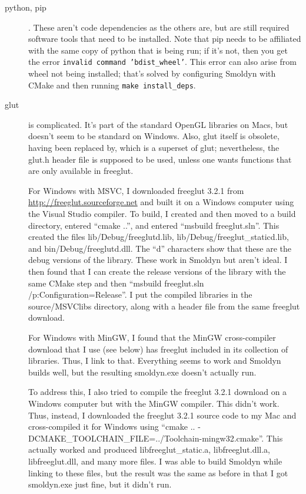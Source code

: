 \documentclass {scrbook}
\newcommand {\ttt} {\texttt}
\begin{document}
\begin{description}

\item[python, pip]. These aren't code dependencies as the others are, but are still required software tools that need to be installed. Note that pip needs to be affiliated with the same copy of python that is being run; if it's not, then you get the error \ttt{invalid command 'bdist\_wheel'}. This error can also arise from wheel not being installed; that's solved by configuring Smoldyn with CMake and then running \ttt{make install\_deps}.

\item[glut] is complicated. It's part of the standard OpenGL libraries on Macs, but doesn't seem to be standard on Windows. Also, glut itself is obsolete, having been replaced by, which is a superset of glut; nevertheless, the glut.h header file is supposed to be used, unless one wants functions that are only available in freeglut.

For Windows with MSVC, I downloaded freeglut 3.2.1 from \url{http://freeglut.sourceforge.net} and built it on a Windows computer using the Visual Studio compiler. To build, I created and then moved to a build directory, entered ``cmake ..'', and entered ``msbuild freeglut.sln''. This created the files lib/Debug/freeglutd.lib, lib/Debug/freeglut\_staticd.lib, and bin/Debug/freeglutd.dll. The ``d'' characters show that these are the debug versions of the library. These work in Smoldyn but aren't ideal. I then found that I can create the release versions of the library with the same CMake step and then ``msbuild freeglut.sln /p:Configuration=Release''. I put the compiled libraries in the source/MSVClibs directory, along with a header file from the same freeglut download.

For Windows with MinGW, I found that the MinGW cross-compiler download that I use (see below) has freeglut included in its collection of libraries. Thus, I link to that. Everything seems to work and Smoldyn builds well, but the resulting smoldyn.exe doesn't actually run.

To address this, I also tried to compile the freeglut 3.2.1 download on a Windows computer but with the MinGW compiler. This didn't work. Thus, instead, I downloaded the freeglut 3.2.1 source code to my Mac and cross-compiled it for Windows using ``cmake .. -DCMAKE\_TOOLCHAIN\_FILE=../Toolchain-mingw32.cmake''. This actually worked and produced libfreeglut\_static.a, libfreeglut.dll.a, libfreeglut.dll, and many more files. I was able to build Smoldyn while linking to these files, but the result was the same as before in that I got smoldyn.exe just fine, but it didn't run.


\end{description}
\end{document}
